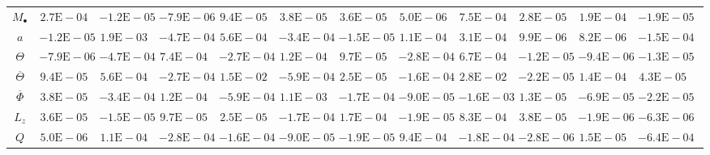 \begin{sidewaystable}[htbp]\footnotesize
\centering
\begin{tabular}{cD{.}{.}{2.5}D{.}{.}{2.5}D{.}{.}{2.5}D{.}{.}{2.5}D{.}{.}{2.5}D{.}{.}{2.5}D{.}{.}{2.5}D{.}{.}{2.5}D{.}{.}{2.5}D{.}{.}{2.5}D{.}{.}{2.5}c}
\toprule
 &  &  &  &  &  &  &  &  &  &  &  \\ \midrule
$M_\bullet$ & $2.7\mathrm{E}-04$ & $-1.2\mathrm{E}-05$ & $-7.9\mathrm{E}-06$ & $9.4\mathrm{E}-05$ & $3.8\mathrm{E}-05$ & $3.6\mathrm{E}-05$ & $5.0\mathrm{E}-06$ & $7.5\mathrm{E}-04$ & $2.8\mathrm{E}-05$ & $1.9\mathrm{E}-04$ & $-1.9\mathrm{E}-05$ \\
$a$ & $-1.2\mathrm{E}-05$ & $1.9\mathrm{E}-03$ & $-4.7\mathrm{E}-04$ & $5.6\mathrm{E}-04$ & $-3.4\mathrm{E}-04$ & $-1.5\mathrm{E}-05$ & $1.1\mathrm{E}-04$ & $3.1\mathrm{E}-04$ & $9.9\mathrm{E}-06$ & $8.2\mathrm{E}-06$ & $-1.5\mathrm{E}-04$ \\
$\Theta$ & $-7.9\mathrm{E}-06$ & $-4.7\mathrm{E}-04$ & $7.4\mathrm{E}-04$ & $-2.7\mathrm{E}-04$ & $1.2\mathrm{E}-04$ & $9.7\mathrm{E}-05$ & $-2.8\mathrm{E}-04$ & $6.7\mathrm{E}-04$ & $-1.2\mathrm{E}-05$ & $-9.4\mathrm{E}-06$ & $-1.3\mathrm{E}-05$ \\
$\overline{\Theta}$ & $9.4\mathrm{E}-05$ & $5.6\mathrm{E}-04$ & $-2.7\mathrm{E}-04$ & $1.5\mathrm{E}-02$ & $-5.9\mathrm{E}-04$ & $2.5\mathrm{E}-05$ & $-1.6\mathrm{E}-04$ & $2.8\mathrm{E}-02$ & $-2.2\mathrm{E}-05$ & $1.4\mathrm{E}-04$ & $4.3\mathrm{E}-05$ \\
$\overline{\Phi}$ & $3.8\mathrm{E}-05$ & $-3.4\mathrm{E}-04$ & $1.2\mathrm{E}-04$ & $-5.9\mathrm{E}-04$ & $1.1\mathrm{E}-03$ & $-1.7\mathrm{E}-04$ & $-9.0\mathrm{E}-05$ & $-1.6\mathrm{E}-03$ & $1.3\mathrm{E}-05$ & $-6.9\mathrm{E}-05$ & $-2.2\mathrm{E}-05$ \\
$L_z$ & $3.6\mathrm{E}-05$ & $-1.5\mathrm{E}-05$ & $9.7\mathrm{E}-05$ & $2.5\mathrm{E}-05$ & $-1.7\mathrm{E}-04$ & $1.7\mathrm{E}-04$ & $-1.9\mathrm{E}-05$ & $8.3\mathrm{E}-04$ & $3.8\mathrm{E}-05$ & $-1.9\mathrm{E}-06$ & $-6.3\mathrm{E}-06$ \\
$Q$ & $5.0\mathrm{E}-06$ & $1.1\mathrm{E}-04$ & $-2.8\mathrm{E}-04$ & $-1.6\mathrm{E}-04$ & $-9.0\mathrm{E}-05$ & $-1.9\mathrm{E}-05$ & $9.4\mathrm{E}-04$ & $-1.8\mathrm{E}-04$ & $-2.8\mathrm{E}-06$ & $1.5\mathrm{E}-05$ & $-6.4\mathrm{E}-04$ \\

\end{tabular}
\end{sidewaystable}
